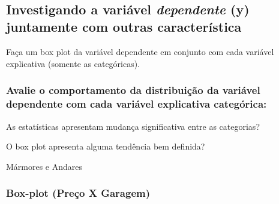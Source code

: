 \documentclass[11pt]{article}
\begin{document}
    \begin{center}
    \end{center}
    { \hspace*{\fill} \\}
    
    \hypertarget{investigando-a-variuxe1vel-dependente-y-juntamente-com-outras-caracteruxedstica}{%
\subsection{\texorpdfstring{Investigando a variável \emph{dependente}
(y) juntamente com outras
característica}{Investigando a variável dependente (y) juntamente com outras característica}}\label{investigando-a-variuxe1vel-dependente-y-juntamente-com-outras-caracteruxedstica}}

Faça um box plot da variável dependente em conjunto com cada variável
explicativa (somente as categóricas).

\hypertarget{avalie-o-comportamento-da-distribuiuxe7uxe3o-da-variuxe1vel-dependente-com-cada-variuxe1vel-explicativa-categuxf3rica}{%
\subsubsection{Avalie o comportamento da distribuição da variável
dependente com cada variável explicativa
categórica:}\label{avalie-o-comportamento-da-distribuiuxe7uxe3o-da-variuxe1vel-dependente-com-cada-variuxe1vel-explicativa-categuxf3rica}}

As estatísticas apresentam mudança significativa entre as categorias?

O box plot apresenta alguma tendência bem definida?

Mármores e Andares

    \hypertarget{box-plot-preuxe7o-x-garagem}{%
\subsubsection{Box-plot (Preço X
Garagem)}\label{box-plot-preuxe7o-x-garagem}}
\end{document}
